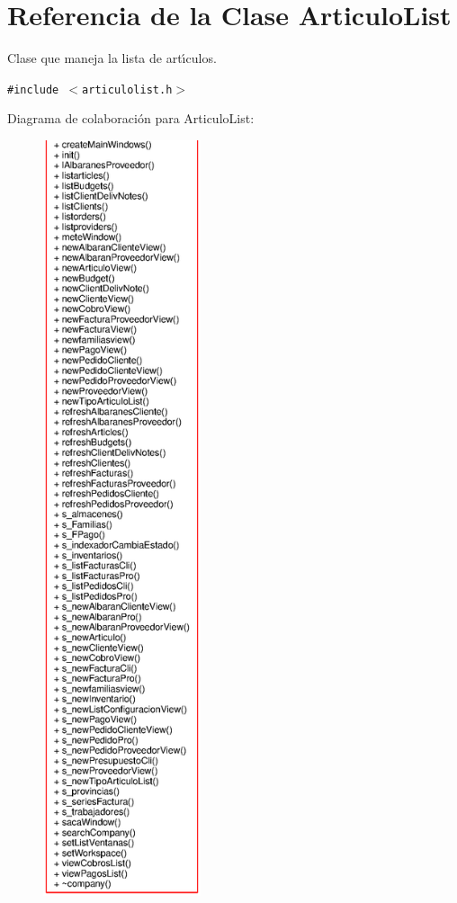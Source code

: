 \section{Referencia de la Clase Articulo\-List}
\label{classArticuloList}
Clase que maneja la lista de art\'{\i}culos.  


{\tt \#include $<$articulolist.h$>$}

Diagrama de colaboraci\'{o}n para Articulo\-List:\begin{figure}[H]
\begin{center}
\leavevmode
\includegraphics[width=131pt]{classArticuloList__coll__graph}
\end{center}
\end{figure}
